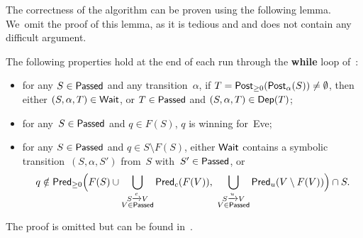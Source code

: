 The correctness of the algorithm can be proven using the following
lemma. We~omit the proof of this lemma, as it is tedious and and does
not contain any difficult argument.

\begin{lemma}\label{10-lem:sotftr}
  The following properties hold at the end of each run through
  the \textbf{while} loop of~:
  \begin{itemize}
  \item for any $S\in\textsf{Passed}$ and any transition~$\alpha$, if
    $T=\textrm{\sf Post}_{\geq 0}(\textrm{\sf Post}_\alpha(S))\not=\emptyset$,
    then either $(S,\alpha,T)\in\textsf{Wait}$, or
    $T\in\textsf{Passed}$ and $(S,\alpha,T)\in\textsf{Dep}(T)$;
  \item for any~$S\in\textsf{Passed}$ and $q\in F(S)$,  $q$ is winning for~Eve;
  \item for any $S\in\textsf{Passed}$ and $q\in S\setminus F(S)$,
    either
    $\textsf{Wait}$ contains a symbolic transition~$(S,\alpha,S')$ from~$S$
    with~$S'\in\textsf{Passed}$,
    or
    \[
      q\notin \predt\Bigl(F(S)\cup \bigcup_{\substack{S\xrightarrow{c} V\\ V\in\Passed}} \predc(F(V)),\ \bigcup_{\substack{S\xrightarrow{u} V\\ V\in\Passed}} \predu(V\setminus F(V))\Bigr) \cap S.
    \]
  \end{itemize}
\end{lemma}
The proof is omitted but can be found in~\cite{CDFLL05}.


